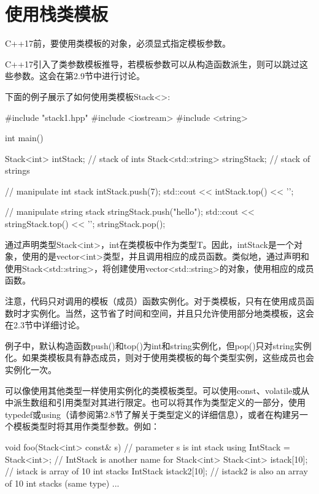 \section{使用栈类模板}

C++17前，要使用类模板的对象，必须显式指定模板参数。

\begin{notice}
C++17引入了类参数模板推导，若模板参数可以从构造函数派生，则可以跳过这些参数。这会在第2.9节中进行讨论。
\end{notice}

下面的例子展示了如何使用类模板Stack<>:

\begin{cpp}
#include "stack1.hpp"
#include <iostream>
#include <string>

int main()
{
	Stack<int> intStack; // stack of ints
	Stack<std::string> stringStack; // stack of strings
	
	// manipulate int stack
	intStack.push(7);
	std::cout << intStack.top() << '\n';
	
	// manipulate string stack
	stringStack.push("hello");
	std::cout << stringStack.top() << '\n';
	stringStack.pop();
}
\end{cpp}

通过声明类型Stack<int>，int在类模板中作为类型T。因此，intStack是一个对象，使用的是vector<int>类型，并且调用相应的成员函数。类似地，通过声明和使用Stack<std::string>，将创建使用vector<std::string>的对象，使用相应的成员函数。

注意，代码只对调用的模板（成员）函数实例化。对于类模板，只有在使用成员函数时才实例化。当然，这节省了时间和空间，并且只允许使用部分地类模板，这会在2.3节中详细讨论。

例子中，默认构造函数push()和top()为int和string实例化，但pop()只对string实例化。如果类模板具有静态成员，则对于使用类模板的每个类型实例，这些成员也会实例化一次。

可以像使用其他类型一样使用实例化的类模板类型。可以使用const、volatile或从中派生数组和引用类型对其进行限定。也可以将其作为类型定义的一部分，使用typedef或using（请参阅第2.8节了解关于类型定义的详细信息），或者在构建另一个模板类型时将其用作类型参数。例如：

\begin{cpp}
void foo(Stack<int> const& s) // parameter s is int stack
{
	using IntStack = Stack<int>; // IntStack is another name for Stack<int>
	Stack<int> istack[10]; // istack is array of 10 int stacks
	IntStack istack2[10]; // istack2 is also an array of 10 int stacks (same type)
	...
}
\end{cpp}

